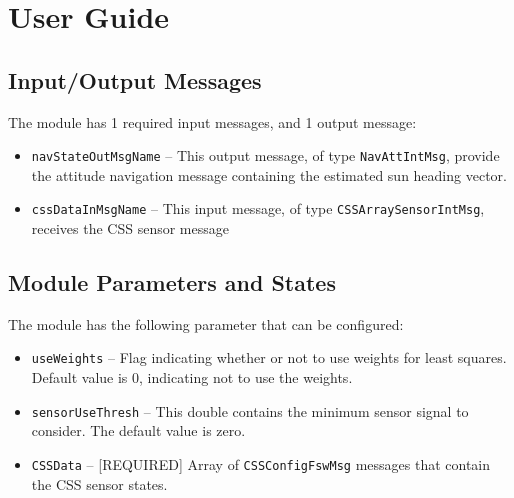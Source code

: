 
\section{User Guide}
\subsection{Input/Output Messages}
The module has 1 required input messages, and 1 output message:
\begin{itemize}
	\item {\tt navStateOutMsgName} -- This output message, of type {\tt NavAttIntMsg}, provide the attitude navigation message containing the estimated sun heading vector.
	\item {\tt cssDataInMsgName} -- This input message, of type {\tt CSSArraySensorIntMsg}, receives the CSS sensor message
\end{itemize}

\subsection{Module Parameters and States}
The module has the following parameter that can be configured:
\begin{itemize}
	\item {\tt useWeights} -- Flag indicating whether or not to use weights for least squares.  Default value is 0, indicating not to use the weights.
	
	\item {\tt sensorUseThresh} -- This double contains the minimum sensor signal to consider.     The default value is zero. 
	
	\item {\tt CSSData} -- [REQUIRED] Array of {\tt CSSConfigFswMsg} messages that contain the CSS sensor states.	
\end{itemize}
